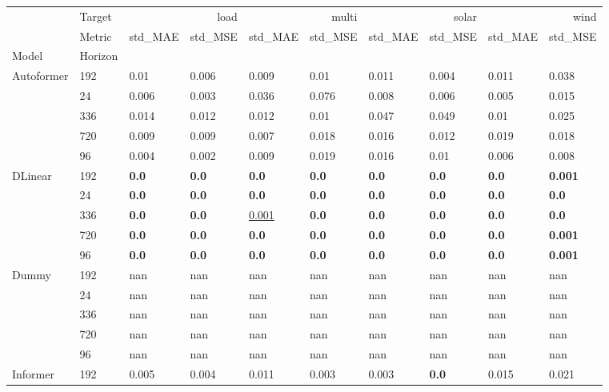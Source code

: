 \begin{tabular}{llllllllll}
\toprule
 & Target & \multicolumn{2}{r}{load} & \multicolumn{2}{r}{multi} & \multicolumn{2}{r}{solar} & \multicolumn{2}{r}{wind} \\
 & Metric & std_MAE & std_MSE & std_MAE & std_MSE & std_MAE & std_MSE & std_MAE & std_MSE \\
Model & Horizon &  &  &  &  &  &  &  &  \\
\midrule
\multirow[t]{5}{*}{Autoformer} & 192 & 0.01 & 0.006 & 0.009 & 0.01 & 0.011 & 0.004 & 0.011 & 0.038 \\
 & 24 & 0.006 & 0.003 & 0.036 & 0.076 & 0.008 & 0.006 & 0.005 & 0.015 \\
 & 336 & 0.014 & 0.012 & 0.012 & 0.01 & 0.047 & 0.049 & 0.01 & 0.025 \\
 & 720 & 0.009 & 0.009 & 0.007 & 0.018 & 0.016 & 0.012 & 0.019 & 0.018 \\
 & 96 & 0.004 & 0.002 & 0.009 & 0.019 & 0.016 & 0.01 & 0.006 & 0.008 \\
\cline{1-10}
\multirow[t]{5}{*}{DLinear} & 192 & \textbf{0.0} & \textbf{0.0} & \textbf{0.0} & \textbf{0.0} & \textbf{0.0} & \textbf{0.0} & \textbf{0.0} & \textbf{0.001} \\
 & 24 & \textbf{0.0} & \textbf{0.0} & \textbf{0.0} & \textbf{0.0} & \textbf{0.0} & \textbf{0.0} & \textbf{0.0} & \textbf{0.0} \\
 & 336 & \textbf{0.0} & \textbf{0.0} & \underline{0.001} & \textbf{0.0} & \textbf{0.0} & \textbf{0.0} & \textbf{0.0} & \textbf{0.0} \\
 & 720 & \textbf{0.0} & \textbf{0.0} & \textbf{0.0} & \textbf{0.0} & \textbf{0.0} & \textbf{0.0} & \textbf{0.0} & \textbf{0.001} \\
 & 96 & \textbf{0.0} & \textbf{0.0} & \textbf{0.0} & \textbf{0.0} & \textbf{0.0} & \textbf{0.0} & \textbf{0.0} & \textbf{0.001} \\
\cline{1-10}
\multirow[t]{5}{*}{Dummy} & 192 & nan & nan & nan & nan & nan & nan & nan & nan \\
 & 24 & nan & nan & nan & nan & nan & nan & nan & nan \\
 & 336 & nan & nan & nan & nan & nan & nan & nan & nan \\
 & 720 & nan & nan & nan & nan & nan & nan & nan & nan \\
 & 96 & nan & nan & nan & nan & nan & nan & nan & nan \\
\cline{1-10}
\multirow[t]{5}{*}{Informer} & 192 & 0.005 & 0.004 & 0.011 & 0.003 & 0.003 & \textbf{0.0} & 0.015 & 0.021 \\

\end{tabular}
